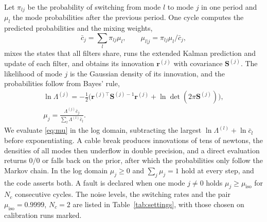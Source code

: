 \documentclass{interact}
\newcommand{\vc}[1]{\bm{#1}}
\newcommand{\mt}[1]{\mathbf{#1}}
\begin{document}
Let $\pi_{lj}$ be the probability of switching from mode $l$ to mode $j$ in one period and $\mu_l$ the mode probabilities after the previous period. One cycle computes the predicted probabilities and the mixing weights,
\begin{equation}\label{eq:mix}
\bar c_j=\sum_l\pi_{lj}\mu_l,\qquad\mu_{l|j}=\pi_{lj}\mu_l/\bar c_j,
\end{equation}
mixes the states that all filters share, runs the extended Kalman prediction and update of each filter, and obtains its innovation $\vc r^{(j)}$ with covariance $\mt S^{(j)}$. The likelihood of mode $j$ is the Gaussian density of its innovation, and the probabilities follow from Bayes' rule,
\begin{equation}\label{eq:mu}
\begin{gathered}
\ln\Lambda^{(j)}=-\tfrac12\big(\vc r^{(j)\top}\mt S^{(j)-1}\vc r^{(j)}+\ln\det(2\pi\mt S^{(j)})\big),\\
\mu_j=\frac{\Lambda^{(j)}\bar c_j}{\sum_l\Lambda^{(l)}\bar c_l}.
\end{gathered}
\end{equation}
We evaluate \eqref{eq:mu} in the log domain, subtracting the largest $\ln\Lambda^{(l)}+\ln\bar c_l$ before exponentiating. A cable break produces innovations of tens of newtons, the densities of all modes then underflow in double precision, and a direct evaluation returns $0/0$ or falls back on the prior, after which the probabilities only follow the Markov chain. In the log domain $\mu_j\ge0$ and $\sum_j\mu_j=1$ hold at every step, and the code asserts both. A fault is declared when one mode $j\ne0$ holds $\mu_j\ge\mu_{\mathrm{iso}}$ for $N_c$ consecutive cycles. The noise levels, the switching rates and the pair $\mu_{\mathrm{iso}}=0.9999$, $N_c=2$ are listed in Table~\ref{tab:settings}, with those chosen on calibration runs marked.
\end{document}
